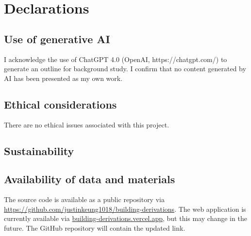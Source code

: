 \chapter{Declarations}
\section{Use of generative AI}
I acknowledge the use of ChatGPT 4.0 (OpenAI, https://chatgpt.com/) to generate an outline for background study. I confirm that no content generated by AI has been presented as my own work.

\section{Ethical considerations}
There are no ethical issues associated with this project.

\section{Sustainability}

\section{Availability of data and materials}
The source code is available as a public repository via \url{https://github.com/justinkeung1018/building-derivations}. The web application is currently available via \url{building-derivations.vercel.app}, but this may change in the future. The GitHub repository will contain the updated link.